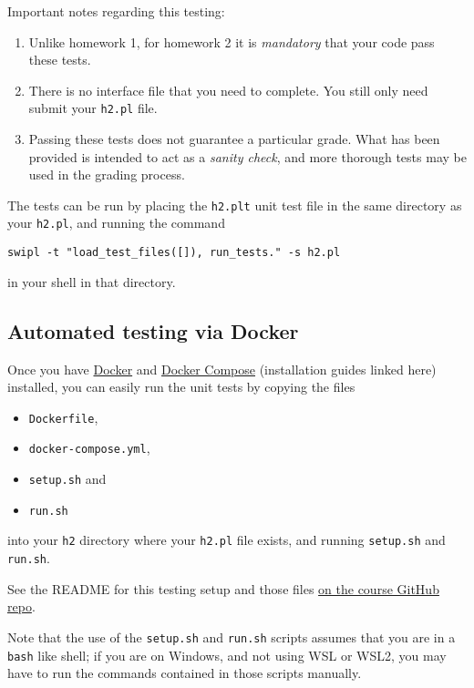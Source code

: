 \documentclass[11pt]{article}
\begin{document}
Important notes regarding this testing:
\begin{enumerate}
\item Unlike homework 1, for homework 2 it is \emph{mandatory}
that your code pass these tests.
\item There is no interface file that you need to complete.
You still only need submit your \texttt{h2.pl} file.
\item Passing these tests does not guarantee a particular grade.
What has been provided is intended to act as a \emph{sanity check},
and more thorough tests may be used in the grading process.
\end{enumerate}

The tests can be run by placing the \texttt{h2.plt} unit test file
in the same directory as your \texttt{h2.pl}, and running the command
\begin{verbatim}
swipl -t "load_test_files([]), run_tests." -s h2.pl
\end{verbatim}
in your shell in that directory.

\subsection*{Automated testing via Docker}
\label{sec:org9ec0c46}
Once you have \href{https://docs.docker.com/get-docker/}{Docker}
and \href{https://docs.docker.com/compose/install/}{Docker Compose}
(installation guides linked here)
installed, you can easily run the unit tests
by copying the files
\begin{itemize}
\item \texttt{Dockerfile},
\item \texttt{docker-compose.yml},
\item \texttt{setup.sh} and
\item \texttt{run.sh}
\end{itemize}
into your \texttt{h2} directory where your \texttt{h2.pl} file exists,
and running \texttt{setup.sh} and \texttt{run.sh}.

See the README for this testing setup and those files
\href{https://github.com/armkeh/principles-of-programming-languages/tree/master/homework/testing/h2}{on the course GitHub repo}.

Note that the use of the \texttt{setup.sh} and \texttt{run.sh} scripts assumes
that you are in a \texttt{bash} like shell; if you are on Windows,
and not using WSL or WSL2, you may have
to run the commands contained in those scripts manually.
\end{document}
